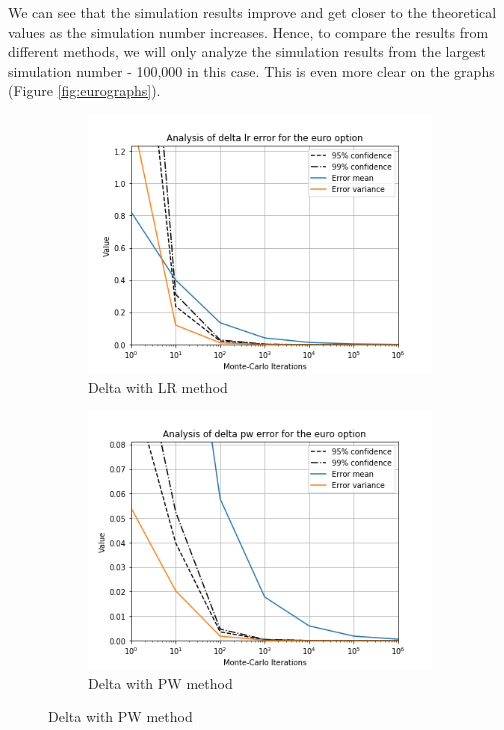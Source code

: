 \documentclass[11pt,a4paper,fleqn]{article}
\begin{document}
We can see that the simulation results improve and get closer to the theoretical values as the simulation number increases. Hence, to compare the results from different methods, we will only analyze the simulation results from the largest simulation number - 100,000 in this case. This is even more clear on the graphs (Figure \ref{fig:eurographs}).

\begin{figure}
  \centering
      \begin{subfigure}[b]{0.45\textwidth}
          \includegraphics[width=\textwidth]{graphs/eurodeltalr.png}
          \caption{Delta with LR method}
      \end{subfigure}
      \begin{subfigure}[b]{0.45\textwidth}
          \includegraphics[width=\textwidth]{graphs/eurodeltapw.png}
          \caption{Delta with PW method}
      \end{subfigure}


\end{figure}
\end{document}
